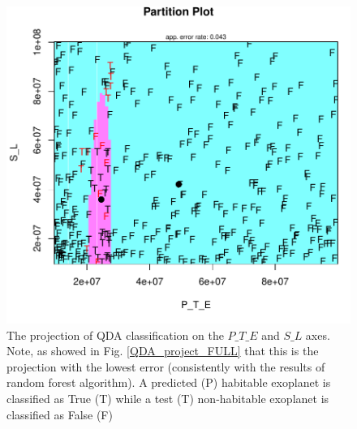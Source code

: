 \documentclass[
12pt, %
a4paper, %
oneside, %
headinclude,footinclude, %
BCOR5mm, %
]{scrartcl}
\begin{document}
\begin{figure}[h]
\begin{center}
\includegraphics[width=1\textwidth]{Pic/QDA_project_RED.pdf}
\caption{The projection of QDA classification on the $P\_T\_E$ and $S\_L$ axes. Note, as showed in Fig. \ref{QDA_project_FULL} that this is the projection with the lowest error (consistently with the results of random forest algorithm). A predicted (P) habitable exoplanet is classified as True (T) while a test (T) non-habitable exoplanet is classified as False (F)}
\label{QDA_project_red}
\end{center}
\end{figure}


\clearpage
\end{document}
